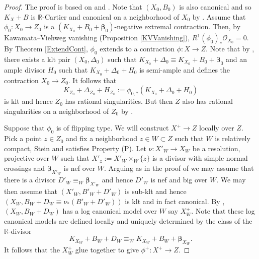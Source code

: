 \documentclass[12pt]{amsart}
\numberwithin{equation}{section}
\theoremstyle{definition}
\theoremstyle{plain}
\newtheorem*{thm A*}{Theorem A}
\newtheorem*{thm B*}{Theorem B}
\newtheorem*{thm C*}{Theorem C}
\newtheorem*{thm D*}{Theorem D}
\theoremstyle{definition}
\renewcommand{\1}{\mathds{1}}
\newcommand{\bbeta}{\boldsymbol{\beta}}
\renewcommand{\>}{\rightarrow}
\newcommand{\R}{\mathbb R}
\begin{document}
\begin{proof}
The proof is based on \cite[Theorem 2]{DefGeneralType} and \cite[Theorem 5.12]{DH24}. Note that $({X_0},B_0)$ is also canonical and so $K_X+B$ is $\R$-Cartier and canonical on a neighborhood of $X_0$ by \cite[Proposition 3.5]{FH11}. Assume that $\phi_0:X_0 \to Z_0$ is a $(K_{X_0}+ B_0 + \bbeta_0)$-negative extremal contraction. Then, by Kawamata--Viehweg vanishing (Proposition \ref{KVVanishing}), $R^1 (\phi_0)_* \mathcal{O}_{X_0} = 0$. By Theorem \ref{ExtendCont}, $\phi_0$ extends to a contraction $\phi: X \to Z$. Note that by \cite{DH24MMP}, there exists a klt pair $(X_0,\Delta _0)$ such that $K_{X_0}+\Delta  _0\equiv K_{X_0}+B_0+\bbeta _0$ and an ample divisor $H_0$ such that $K_{X_0}+\Delta  _0+H_0$ is semi-ample and defines the contraction $X_0\to Z_0$. It follows that $$K_{Z_0}+\Delta  _{Z_0}+H_{Z_0}:=\phi _{0,*}(K_{X_0}+\Delta  _0+H_0)$$ is klt and hence $Z_0$ has rational singularities. But then $Z$ also has rational singularities on a neighborhood of $Z_0$ by \cite{Elkikj}. 

Suppose that $\phi _0$ is of flipping type. %
We will construct  $X^+\to Z$ locally over $Z$. Pick a point $z\in Z_0$ and fix a neighborhood $z\in W\subset Z$ such that $W$ is relatively compact, Stein and satisfies Property (P). %
Let $\nu :X'_W\to X_W$ be a resolution, projective over $W$ such that $X'_z:=X'_W\times _W\{z\}$ is a divisor with simple normal crossings and $\bbeta _{X'_W}$ is nef over $W$. Arguing as in the proof of \cite[Theorem 5.12]{DH24} we may assume that there is a divisor $D'_W\equiv_W \bbeta _{X'_W}$ and hence $D'_W$ is nef and big over $W$. We may then assume that $(X'_W,B'_W+D'_W)$ is sub-klt and hence $(X_W, B_W+D_W\equiv \nu _*( B'_W+D'_W))$ is klt and in fact canonical.
By \cite[Theorem C]{FujinoBCHM},  $({X_W},B_W+D_W)$ has a log canonical model over $W$ say $X^+_W$. Note that these log canonical models are defined locally and uniquely determined by the class of the $\R$-divisor $$K_{X_W}+B_W+D_W\equiv _W K_{X_W}+B_W+\bbeta _{X_W}.$$ It follows that the $X^+_W$ glue together to give $\phi ^+:X^+\to Z$.
    

\end{proof}
\end{document}
